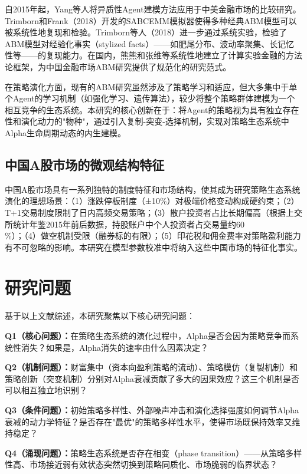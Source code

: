 自2015年起，Yang等人将异质性Agent建模方法应用于中美金融市场的比较研究。Trimborn和Frank（2018）开发的SABCEMM模拟器使得多种经典ABM模型可以被系统性地复现和检验。Trimborn等人（2018）进一步通过系统实验，检验了ABM模型对经验化事实（stylized facts）——如肥尾分布、波动率聚集、长记忆性等——的复现能力。在国内，熊熊和张维等\cite{zhangwei2012methodology}系统性地建立了计算实验金融的方法论框架，为中国金融市场ABM研究提供了规范化的研究范式。

在策略演化方面，现有的ABM研究虽然涉及了策略学习和适应，但大多集中于单个Agent的学习机制（如强化学习、遗传算法），较少将整个策略群体建模为一个相互竞争的生态系统。本研究的核心创新在于：将Agent的策略视为具有独立存在性和演化动力的"物种"，通过引入复制-突变-选择机制，实现对策略生态系统中Alpha生命周期动态的内生建模。

\subsection{中国A股市场的微观结构特征}

中国A股市场具有一系列独特的制度特征和市场结构，使其成为研究策略生态系统演化的理想场景：（1）涨跌停板制度（±10\%）对极端价格变动构成硬约束；（2）T+1交易制度限制了日内高频交易策略；（3）散户投资者占比长期偏高（根据上交所统计年鉴2015年前后数据，持股账户中个人投资者占交易量约60\\\%）；（4）做空机制受限（融券标的有限）；（5）印花税和佣金费率对策略盈利能力有不可忽略的影响。本研究在模型参数校准中将纳入这些中国市场的特征化事实。

\section{研究问题}

基于以上文献综述，本研究聚焦以下核心研究问题：

\textbf{Q1（核心问题）：}在策略生态系统的演化过程中，Alpha是否会因为策略竞争而系统性消失？如果是，Alpha消失的速率由什么因素决定？

\textbf{Q2（机制问题）：}财富集中（资本向盈利策略的流动）、策略模仿（复製机制）和策略创新（突变机制）分别对Alpha衰减贡献了多大的因果效应？这三个机制是否可以相互独立地识别？

\textbf{Q3（条件问题）：}初始策略多样性、外部噪声冲击和演化选择强度如何调节Alpha衰减的动力学特征？是否存在"最优"的策略多样性水平，使得市场既保持效率又维持稳定？

\textbf{Q4（涌现问题）：}策略生态系统是否存在相变（phase transition）——从策略多样性高、市场接近弱有效状态突然切换到策略同质化、市场脆弱的临界状态？

